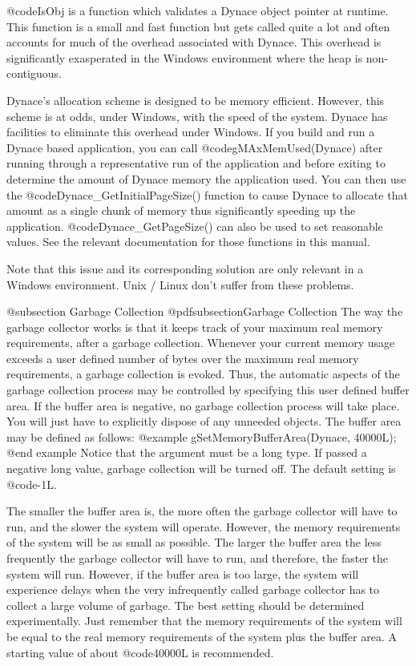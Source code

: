 @code{IsObj} is a function which validates a Dynace object pointer at
runtime.  This function is a small and fast function but gets called
quite a lot and often accounts for much of the overhead associated
with Dynace.  This overhead is significantly exasperated in the
Windows environment where the heap is non-contiguous.

Dynace's allocation scheme is designed to be memory efficient.
However, this scheme is at odds, under Windows, with the speed of the
system. Dynace has facilities to eliminate this overhead under
Windows.  If you build and run a Dynace based application, you can
call @code{gMAxMemUsed(Dynace)} after running through a representative
run of the application and before exiting to determine the amount of
Dynace memory the application used.  You can then use the
@code{Dynace_GetInitialPageSize()} function to cause Dynace to
allocate that amount as a single chunk of memory thus significantly
speeding up the application.  @code{Dynace_GetPageSize()} can also
be used to set reasonable values.  See the relevant documentation
for those functions in this manual.

Note that this issue and its corresponding solution are only relevant
in a Windows environment.  Unix / Linux don't suffer from these problems.

@subsection Garbage Collection
@pdfsubsection{Garbage Collection}
The way the garbage collector works is that it keeps track of your
maximum real memory requirements, after a garbage collection.  Whenever
your current memory usage exceeds a user defined number of bytes over
the maximum real memory requirements, a garbage collection is evoked.
Thus, the automatic aspects of the garbage collection process may be
controlled by specifying this user defined buffer area.  If the buffer
area is negative, no garbage collection process will take place.  You
will just have to explicitly dispose of any unneeded objects.  The
buffer area may be defined as follows:
@example
        gSetMemoryBufferArea(Dynace, 40000L);
@end example
Notice that the argument must be a long type.  If passed a negative long value,
garbage collection will be turned off.  The default setting is @code{-1L}.

The smaller the buffer area is, the more often the garbage collector will
have to run, and the slower the system will operate.  However, the memory
requirements of the system will be as small as possible.  The larger the
buffer area the less frequently the garbage collector will have to run, and
therefore, the faster the system will run.  However, if the buffer area is
too large, the system will experience delays when the very infrequently
called garbage collector has to collect a large volume of garbage.  The
best setting should be determined experimentally.  Just remember that
the memory requirements of the system will be equal to the real memory
requirements of the system plus the buffer area.  A starting value
of about @code{40000L} is recommended.

